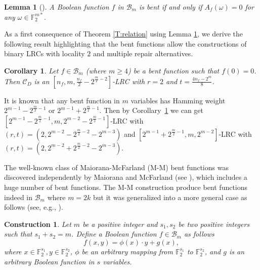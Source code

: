 \documentclass[10pt]{article}
\newtheorem{corollary}{Corollary}
\newtheorem{construction}{Construction}
\newtheorem{lemma}{Lemma}
\newcommand{\F}{\mathbb{F}}
\newcommand{\0}{\textbf{0}}
\newcommand{\1}{\textbf{1}}
\newcommand{\C}{{\mathcal C}}
\begin{document}
\begin{lemma} [\cite{Rothaus}] \label{bent-df}
A Boolean function $f$ in $\mathcal{B}_m$ is bent if and only if $A_f(\omega)=0$ for any $\omega\in\F_2^{m*}$.
\end{lemma}
As a first consequence of Theorem \ref{T:relation} using Lemma \ref{bent-df}, we derive the following result highlighting that the bent functions allow the constructions of binary LRCs with locality $2$ and multiple repair alternatives.
\begin{corollary}\label{T:LRCBent}
Let $f\in \mathcal{B}_m$ (where $m\geq 4$) be a bent function such that $f(0)=0$.
Then $\C_D$ is an $[n_f, m, \frac{n_f}{2}-2^{\frac m2-2}]$-LRC with $r=2$
and $t=\frac{4n_f-2^m}{8}$.
\end{corollary}
 It is known that any bent function in $m$ variables has Hamming weight $2^{m-1}-2^{\frac{m}{2}-1}$ or $2^{m-1}+2^{\frac{m}{2}-1}$.
Then by Corollary~\ref{T:LRCBent} we can get $[2^{m-1}-2^{\frac{m}{2}-1}, m, 2^{m-2}-2^{\frac{m}{2}-1}]$-LRC with $(r, t)=(2, 2^{m-2}-2^{\frac{m}{2}-2}-2^{m-3})$
and $[2^{m-1}+2^{\frac{m}{2}-1}, m, 2^{m-2}]$-LRC with $(r, t)=(2, 2^{m-2}+2^{\frac{m}{2}-2}-2^{m-3})$.

The well-known class of Maiorana-McFarland (M-M) bent functions was discovered independently by Maiorana
and McFarland (see \cite{Dil74,Mcfarland1973differencesets}), which includes a huge number of bent functions.
The M-M construction produce bent functions indeed in $\mathcal{B}_{m}$ where
$m=2k$ but it was generalized into a more general case as follows (see, e.g., \cite{Book-Carlet}).

\iffalse
\begin{construction}[\cite{Dil74,Mcfarland1973differencesets}]\label{C:MMbent}
For $m=2k$, we define a Boolean function $b\in\mathcal{B}_{m}$ as follows
\begin{equation*}\label{Cons.MMbent}
b(x,y)=\phi(x)\cdot y+g(x),
\end{equation*}
where $x,y\in \F_2^{k}$, $\phi$ is an arbitrary permutation over $\F_2^k$,
and $g$ is an arbitrary Boolean function in $k$ variables.
\end{construction}
\fi
\begin{construction}\label{C:GMM}
Let $m$ be a positive integer and $s_1,s_2$ be two positive integers such that $s_1+s_2=m$.
Define a Boolean function $f\in\mathcal{B}_{m}$ as follows
\begin{equation}\label{Cons.GMM}
f(x,y)=\phi(x)\cdot y+g(x),
\end{equation}
where $x\in\F_2^{s_1},y\in\F_2^{s_2}$, $\phi$ be an arbitrary mapping from $\F_2^{s_1}$ to $\F_2^{s_2}$,
and $g$ is an arbitrary Boolean function in $s$ variables.
\end{construction}
\end{document}

